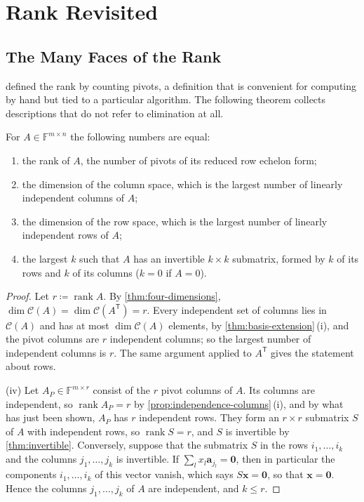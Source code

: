 \section{Rank Revisited}
\label{sec:rank-revisited}

\subsection{The Many Faces of the Rank}

 defined the rank by counting pivots, a definition that is convenient for computing by hand but tied to a particular algorithm. The following theorem collects descriptions that do not refer to elimination at all.

\begin{theorem}
\label{thm:rank-characterisations}
For $A\in\mathbb F^{m\times n}$ the following numbers are equal:
\begin{enumerate}
\item the rank of $A$, the number of pivots of its reduced row echelon form;
\item the dimension of the column space, which is the largest number of linearly independent columns of $A$;
\item the dimension of the row space, which is the largest number of linearly independent rows of $A$;
\item the largest $k$ such that $A$ has an invertible $k\times k$ submatrix, formed by $k$ of its rows and $k$ of its columns ($k=0$ if $A=0$).
\end{enumerate}
\end{theorem}

\begin{proof}
Let $r\coloneqq\operatorname{rank}A$. By \cref{thm:four-dimensions}, $\dim\mathcal C(A)=\dim\mathcal C(A^{\mathsf T})=r$. Every independent set of columns lies in $\mathcal C(A)$ and has at most $\dim\mathcal C(A)$ elements, by \cref{thm:basis-extension}\,(i), and the pivot columns are $r$ independent columns; so the largest number of independent columns is $r$. The same argument applied to $A^{\mathsf T}$ gives the statement about rows.

(iv) Let $A_P\in\mathbb F^{m\times r}$ consist of the $r$ pivot columns of $A$. Its columns are independent, so $\operatorname{rank}A_P=r$ by \cref{prop:independence-columns}\,(i), and by what has just been shown, $A_P$ has $r$ independent rows. They form an $r\times r$ submatrix $S$ of $A$ with independent rows, so $\operatorname{rank}S=r$, and $S$ is invertible by \cref{thm:invertible}. Conversely, suppose that the submatrix $S$ in the rows $i_1,\ldots,i_k$ and the columns $j_1,\ldots,j_k$ is invertible. If $\sum_lx_l\mathbf a_{j_l}=\mathbf 0$, then in particular the components $i_1,\ldots,i_k$ of this vector vanish, which says $S\mathbf x=\mathbf 0$, so that $\mathbf x=\mathbf 0$. Hence the columns $j_1,\ldots,j_k$ of $A$ are independent, and $k\le r$.
\end{proof}

